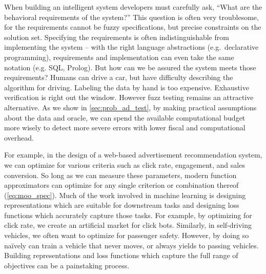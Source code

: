 When building an intelligent system developers must carefully ask, ``What are the behavioral requirements of the system?'' This question is often very troublesome, for the requirements cannot be fuzzy specifications, but precise constraints on the solution set. Specifying the requirements is often indistinguishable from implementing the system -- with the right language abstractions (e.g.\ declarative programming), requirements and implementation can even take the same notation (e.g. SQL, Prolog). But how can we be assured the system meets those requirements? Humans can drive a car, but have difficulty describing the algorithm for driving. Labeling the data by hand is too expensive. Exhaustive verification is right out the window. However fuzz testing remains an attractive alternative. As we show in \autoref{sec:prob_ad_test}, by making practical assumptions about the data and oracle, we can spend the available computational budget more wisely to detect more severe errors with lower fiscal and computational overhead.

For example, in the design of a web-based advertisement recommendation system, we can optimize for various criteria such as click rate, engagement, and sales conversion. So long as we can measure these parameters, modern function approximators can optimize for any single criterion or combination thereof (\autoref{eq:moo_spec}). Much of the work involved in machine learning is designing representations which are suitable for downstream tasks and designing loss functions which accurately capture those tasks. For example, by optimizing for click rate, we create an artificial market for click bots. Similarly, in self-driving vehicles, we often want to optimize for passenger safety. However, by doing so na\"ively can train a vehicle that never moves, or always yields to passing vehicles. Building representations and loss functions which capture the full range of objectives can be a painstaking process.